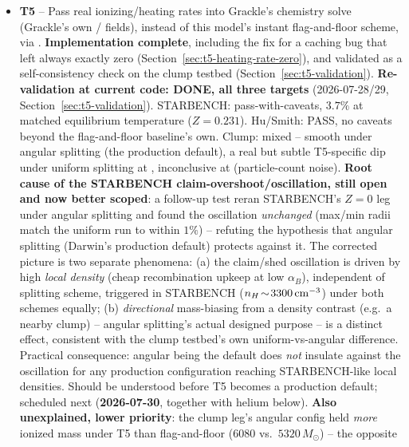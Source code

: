 \begin{itemize}
  \item[$\square$] \textbf{T5} -- Pass real ionizing/heating rates
    into Grackle's chemistry solve (Grackle's own /
     fields), instead of this model's
    instant flag-and-floor scheme, via
    .
    \textbf{Implementation complete}, including the fix for a caching
    bug that left  always exactly zero
    (Section~\ref{sec:t5-heating-rate-zero}), and validated as a
    self-consistency check on the clump testbed
    (Section~\ref{sec:t5-validation}).
    \textbf{Re-validation at current code: DONE, all three targets}
    (2026-07-28/29, Section~\ref{sec:t5-validation}). STARBENCH:
    pass-with-caveats, $3.7\%$ at matched equilibrium temperature
    ($Z=0.231$). Hu/Smith: PASS, no caveats beyond the flag-and-floor
    baseline's own. Clump: mixed -- smooth under angular splitting
    (the production default), a real but subtle T5-specific dip under
    uniform splitting at , inconclusive at
     (particle-count noise).
    \textbf{Root cause of the STARBENCH claim-overshoot/oscillation,
    still open and now better scoped}: a follow-up test reran
    STARBENCH's $Z=0$ leg under angular splitting and found the
    oscillation \emph{unchanged} (max/min radii match the uniform run
    to within $1\%$) -- refuting the hypothesis that angular splitting
    (Darwin's production default) protects against it. The corrected
    picture is two separate phenomena: (a) the claim/shed oscillation
    is driven by high \emph{local density} (cheap recombination
    upkeep at low $\alpha_B$), independent of splitting scheme,
    triggered in STARBENCH ($n_H\!\sim\!3300\,{\rm cm^{-3}}$) under
    both schemes equally; (b) \emph{directional} mass-biasing from a
    density contrast (e.g.\ a nearby clump) -- angular splitting's
    actual designed purpose -- is a distinct effect, consistent with
    the clump testbed's own uniform-vs-angular difference. Practical
    consequence: angular being the default does \emph{not} insulate
    against the oscillation for any production configuration reaching
    STARBENCH-like local densities. Should be understood before T5
    becomes a production default; scheduled next
    (\textbf{2026-07-30}, together with helium below).
    \textbf{Also unexplained, lower priority}: the clump leg's angular
     config held \emph{more} ionized mass under T5
    than flag-and-floor ($6080$ vs.\ $5320\,M_\odot$) -- the opposite

\end{itemize}
